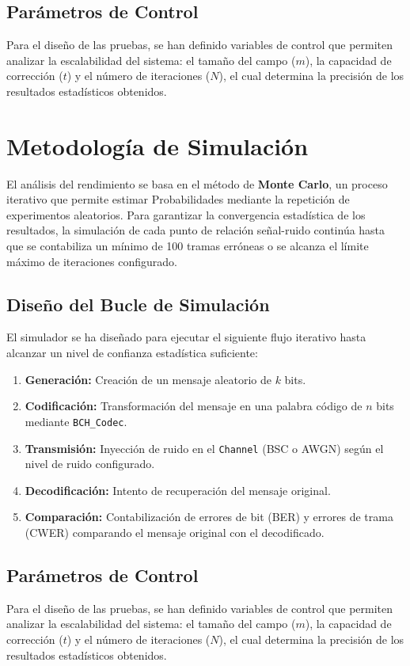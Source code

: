 \subsection{Parámetros de Control}
Para el diseño de las pruebas, se han definido variables de control que permiten analizar la escalabilidad del sistema: el tamaño del campo ($m$), la capacidad de corrección ($t$) y el número de iteraciones ($N$), el cual determina la precisión de los resultados estadísticos obtenidos.

\section{Metodología de Simulación}
El análisis del rendimiento se basa en el método de \textbf{Monte Carlo}, un proceso iterativo que permite estimar Probabilidades mediante la repetición de experimentos aleatorios. Para garantizar la convergencia estadística de los resultados, la simulación de cada punto de relación señal-ruido continúa hasta que se contabiliza un mínimo de 100 tramas erróneas o se alcanza el límite máximo de iteraciones configurado.

\subsection{Diseño del Bucle de Simulación}
El simulador se ha diseñado para ejecutar el siguiente flujo iterativo hasta alcanzar un nivel de confianza estadística suficiente:
\begin{enumerate}
    \item \textbf{Generación:} Creación de un mensaje aleatorio de $k$ bits.
    \item \textbf{Codificación:} Transformación del mensaje en una palabra código de $n$ bits mediante \verb|BCH_Codec|.
    \item \textbf{Transmisión:} Inyección de ruido en el \verb|Channel| (BSC o AWGN) según el nivel de ruido configurado.
    \item \textbf{Decodificación:} Intento de recuperación del mensaje original.
    \item \textbf{Comparación:} Contabilización de errores de bit (BER) y errores de trama (CWER) comparando el mensaje original con el decodificado.
\end{enumerate}

\subsection{Parámetros de Control}
Para el diseño de las pruebas, se han definido variables de control que permiten analizar la escalabilidad del sistema: el tamaño del campo ($m$), la capacidad de corrección ($t$) y el número de iteraciones ($N$), el cual determina la precisión de los resultados estadísticos obtenidos.

